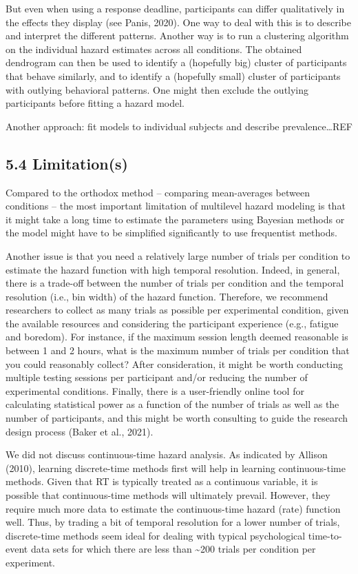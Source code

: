 \documentclass[
  man,floatsintext]{apa6}
\begin{document}
But even when using a response deadline, participants can differ qualitatively in the effects they display (see Panis, 2020). One way to deal with this is to describe and interpret the different patterns. Another way is to run a clustering algorithm on the individual hazard estimates across all conditions. The obtained dendrogram can then be used to identify a (hopefully big) cluster of participants that behave similarly, and to identify a (hopefully small) cluster of participants with outlying behavioral patterns. One might then exclude the outlying participants before fitting a hazard model.

Another approach: fit models to individual subjects and describe prevalence\ldots REF

\subsection{5.4 Limitation(s)}\label{limitations}

Compared to the orthodox method -- comparing mean-averages between conditions -- the most important limitation of multilevel hazard modeling is that it might take a long time to estimate the parameters using Bayesian methods or the model might have to be simplified significantly to use frequentist methods.

Another issue is that you need a relatively large number of trials per condition to estimate the hazard function with high temporal resolution. Indeed, in general, there is a trade-off between the number of trials per condition and the temporal resolution (i.e., bin width) of the hazard function. Therefore, we recommend researchers to collect as many trials as possible per experimental condition, given the available resources and considering the participant experience (e.g., fatigue and boredom). For instance, if the maximum session length deemed reasonable is between 1 and 2 hours, what is the maximum number of trials per condition that you could reasonably collect? After consideration, it might be worth conducting multiple testing sessions per participant and/or reducing the number of experimental conditions. Finally, there is a user-friendly online tool for calculating statistical power as a function of the number of trials as well as the number of participants, and this might be worth consulting to guide the research design process (Baker et al., 2021).

We did not discuss continuous-time hazard analysis. As indicated by Allison (2010), learning discrete-time methods first will help in learning continuous-time methods. Given that RT is typically treated as a continuous variable, it is possible that continuous-time methods will ultimately prevail. However, they require much more data to estimate the continuous-time hazard (rate) function well. Thus, by trading a bit of temporal resolution for a lower number of trials, discrete-time methods seem ideal for dealing with typical psychological time-to-event data sets for which there are less than \textasciitilde200 trials per condition per experiment.
\end{document}
